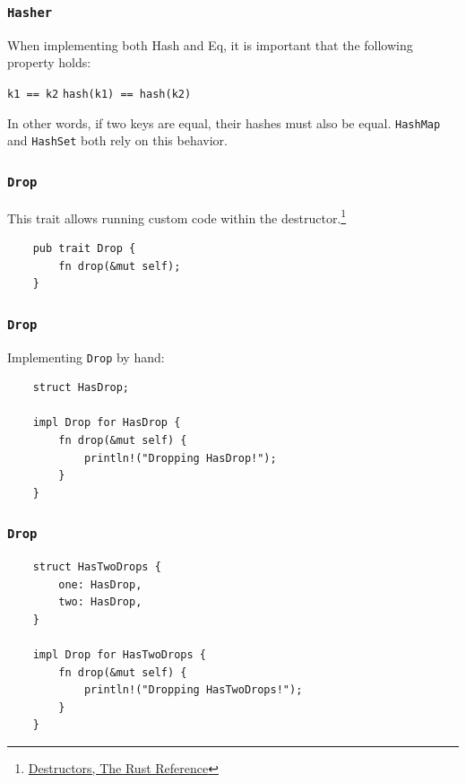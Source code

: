 \documentclass[aspectratio=1610,t]{beamer}
\begin{document}

\begin{frame}[fragile]
\frametitle{\texttt{Hasher}}
When implementing both Hash and Eq, it is important that the following property holds:

\texttt{k1 == k2} \Longrightarrow \texttt{hash(k1) == hash(k2)}

In other words, if two keys are equal, their hashes must also be equal. \texttt{HashMap} and \texttt{HashSet} both rely on this behavior.
\end{frame}


\begin{frame}[fragile]
\frametitle{\texttt{Drop}}
This trait allows running custom code within the destructor.\footnote{\href{https://doc.rust-lang.org/reference/destructors.html}{Destructors, The Rust Reference}}

\begin{verbatim}
    pub trait Drop {
        fn drop(&mut self);
    }
\end{verbatim}
\end{frame}


\begin{frame}[fragile]
\frametitle{\texttt{Drop}}
Implementing \texttt{Drop} by hand:

\begin{verbatim}
    struct HasDrop;

    impl Drop for HasDrop {
        fn drop(&mut self) {
            println!("Dropping HasDrop!");
        }
    }
\end{verbatim}
\end{frame}


\begin{frame}[fragile]
\frametitle{\texttt{Drop}}
\begin{verbatim}
    struct HasTwoDrops {
        one: HasDrop,
        two: HasDrop,
    }

    impl Drop for HasTwoDrops {
        fn drop(&mut self) {
            println!("Dropping HasTwoDrops!");
        }
    }
\end{verbatim}
\end{frame}
\end{document}
